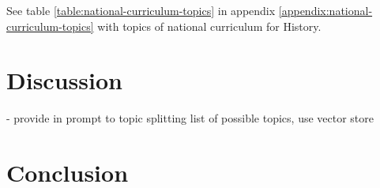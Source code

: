 \documentclass[]{interact}
\theoremstyle{plain}%
\theoremstyle{definition}
\theoremstyle{remark}
\begin{document}
See table \ref{table:national-curriculum-topics} in appendix \ref{appendix:national-curriculum-topics} with topics of national curriculum for History.




\section{Discussion}




- provide in prompt to topic splitting list of possible topics, use vector store



\section{Conclusion}






\end{document}

